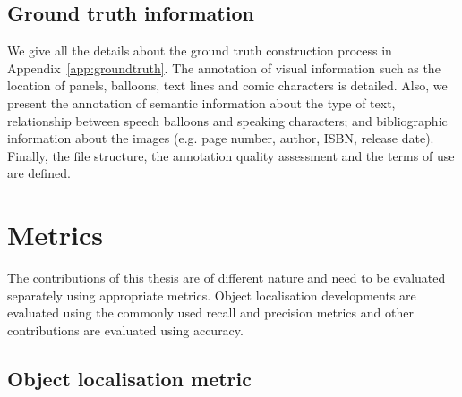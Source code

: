 
\subsection{Ground truth information} %
\label{sub:ground_truth}

We give all the details about the ground truth construction process in Appendix~\ref{app:groundtruth}.
The annotation of visual information such as the location of panels, balloons, text lines and comic characters is detailed.
Also, we present the annotation of semantic information about the type of text, relationship between speech balloons and speaking characters; and bibliographic information about the images (e.g. page number, author, ISBN, release date).
Finally, the file structure, the annotation quality assessment and the terms of use are defined.






\section{Metrics} %
\label{sec:ex:metrics}
The contributions of this thesis are of different nature and need to be evaluated separately using appropriate metrics.
Object localisation developments are evaluated using the commonly used recall and precision metrics and other contributions are evaluated using accuracy.

\subsection{Object localisation metric} %
\label{sub:ex:object_localisation_metric}


